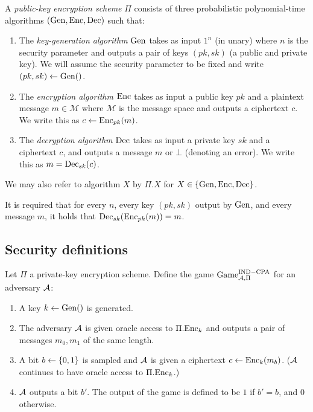 \begin{definition}
	A \emph{public-key encryption scheme} $\Pi$ consists of three probabilistic polynomial-time algorithms $(\mathrm{Gen}, \mathrm{Enc}, \mathrm{Dec})$ such that:
	\begin{enumerate}[1.]
		\item The \emph{key-generation algorithm} $\mathrm{Gen}$ takes as input $1^n$ (in unary) where $n$ is the security parameter and outputs a pair of keys $(pk, sk)$ (a public and private key). We will assume the security parameter to be fixed and write $(pk, sk) \leftarrow \mathrm{Gen}()$.
		\item The \emph{encryption algorithm} $\mathrm{Enc}$ takes as input a public key $pk$ and a plaintext message $m \in \mathcal{M}$ where $\mathcal{M}$ is the message space and outputs a ciphertext $c$. We write this as $c \leftarrow \mathrm{Enc}_{pk}(m)$.
		\item The \emph{decryption algorithm} $\mathrm{Dec}$ takes as input a private key $sk$ and a ciphertext $c$, and outputs a message $m$ or $\bot$ (denoting an error). We write this as $m = \mathrm{Dec}_{sk}(c)$.
	\end{enumerate}

	We may also refer to algorithm $X$ by $\Pi.X$ for $X \in \{\mathrm{Gen}, \mathrm{Enc}, \mathrm{Dec}\}$.

	It is required that for every $n$, every key $(pk, sk)$ output by $\mathrm{Gen}$, and every message $m$, it holds that $\mathrm{Dec}_{sk}(\mathrm{Enc}_{pk}(m)) = m$.
\end{definition}

\subsection{Security definitions}

\begin{definition}
	Let $\Pi$ a private-key encryption scheme. Define the game $\mathrm{Game}_{\mathcal{A}, \Pi}^{\mathrm{IND-CPA}}$ for an adversary $\mathcal{A}$:
	\begin{enumerate}[1.]
		\item A key $k \leftarrow \mathrm{Gen}()$ is generated.
		\item The adversary $\mathcal{A}$ is given oracle access to $\Pi.\mathrm{Enc}_k$ and outputs a pair of messages $m_0, m_1$ of the same length.
		\item A bit $b \leftarrow \{0, 1\}$ is sampled and $\mathcal{A}$ is given a ciphertext $c \leftarrow \mathrm{Enc}_k(m_b)$. ($\mathcal{A}$ continues to have oracle access to $\Pi.\mathrm{Enc}_k$.)
		\item $\mathcal{A}$ outputs a bit $b'$. The output of the game is defined to be $1$ if $b' = b$, and $0$ otherwise.
	\end{enumerate}
\end{definition}

